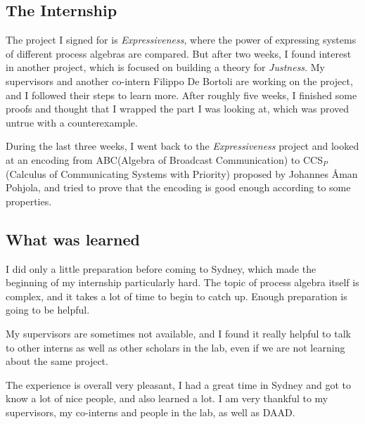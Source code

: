 \documentclass[adraft]{eptcs}
\begin{document}
\subsection{The Internship}
The project I signed for is \emph{Expressiveness}, where the power of expressing systems of different process algebras are compared. But after two weeks, I found interest in another project, which is focused on building a theory for \emph{Justness}. My supervisors and another co-intern Filippo De Bortoli are working on the project, and I followed their steps to learn more. After roughly five weeks, I finished some proofs and thought that I wrapped the part I was looking at, which was proved untrue with a counterexample.

During the last three weeks, I went back to the \emph{Expressiveness} project and looked at an encoding from ABC(Algebra of Broadcast Communication) to CCS$_P$ (Calculus of Communicating Systems with Priority) proposed by Johannes \AA man Pohjola, and tried to prove that the encoding is good enough according to some properties.

\subsection{What was learned}
I did only a little preparation before coming to Sydney, which made the beginning of my internship particularly hard. The topic of process algebra itself is complex, and it takes a lot of time to begin to catch up. Enough preparation is going to be helpful.

My supervisors are sometimes not available, and I found it really helpful to talk to other interns as well as other scholars in the lab, even if we are not learning about the same project.

The experience is overall very pleasant, I had a great time in Sydney and got to know a lot of nice people, and also learned a lot. I am very thankful to my supervisors, my co-interns and people in the lab, as well as DAAD.
\end{document}
